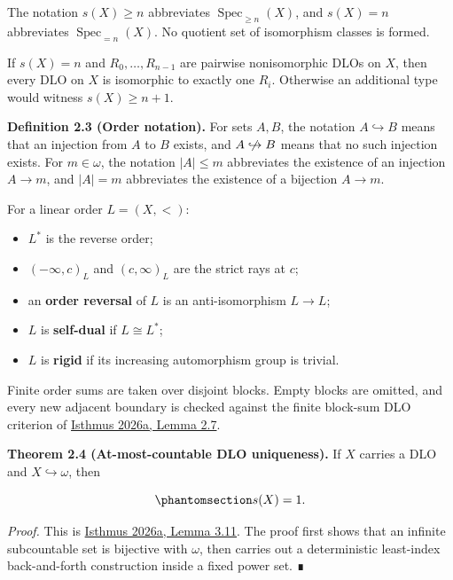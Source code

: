 \documentclass[
  english,
  11pt,
  reqno]{amsart}
\providecommand{\tightlist}{%
  \setlength{\itemsep}{0pt}\setlength{\parskip}{0pt}}
\providecommand{\nhookrightarrow}{\centernot\hookrightarrow}
\begin{document}
The notation \(s(X)\ge n\) abbreviates
\(\operatorname{Spec}_{\ge n}(X)\), and \(s(X)=n\) abbreviates
\(\operatorname{Spec}_{=n}(X)\). No quotient set of isomorphism classes
is formed.

If \(s(X)=n\) and \(R_0,\ldots,R_{n-1}\) are pairwise nonisomorphic DLOs
on \(X\), then every DLO on \(X\) is isomorphic to exactly one \(R_i\).
Otherwise an additional type would witness \(s(X)\ge n+1\).

\protect{}\label{def:2-3-order-notation}

\textbf{Definition 2.3 (Order notation).} For sets \(A,B\), the notation
\(A\hookrightarrow B\) means that an injection from \(A\) to \(B\)
exists, and \(A\nhookrightarrow B\) means that no such injection exists.
For \(m\in\omega\), the notation \(|A|\le m\) abbreviates the existence
of an injection \(A\to m\), and \(|A|=m\) abbreviates the existence of a
bijection \(A\to m\).

For a linear order \(L=(X,<)\):

\begin{itemize}
\tightlist
\item
  \(L^*\) is the reverse order;
\item
  \((-\infty,c)_L\) and \((c,\infty)_L\) are the strict rays at \(c\);
\item
  an \textbf{order reversal} of \(L\) is an anti-isomorphism \(L\to L\);
\item
  \(L\) is \textbf{self-dual} if \(L\cong L^*\);
\item
  \(L\) is \textbf{rigid} if its increasing automorphism group is
  trivial.
\end{itemize}

Finite order sums are taken over disjoint blocks. Empty blocks are
omitted, and every new adjacent boundary is checked against the finite
block-sum DLO criterion of \hyperref[ref:isthmus2026a]{Isthmus 2026a,
Lemma 2.7}.

\protect{}\label{thm:2-4-subcountable-uniqueness}

\textbf{Theorem 2.4 (At-most-countable DLO uniqueness).} If \(X\)
carries a DLO and \(X\hookrightarrow\omega\), then

\begin{equation}\protect\phantomsection\label{eq:subcountable-uniqueness}{
s(X)=1.
}\end{equation}

\emph{Proof.} This is \hyperref[ref:isthmus2026a]{Isthmus 2026a, Lemma
3.11}. The proof first shows that an infinite subcountable set is
bijective with \(\omega\), then carries out a deterministic least-index
back-and-forth construction inside a fixed power set. ∎
\end{document}
